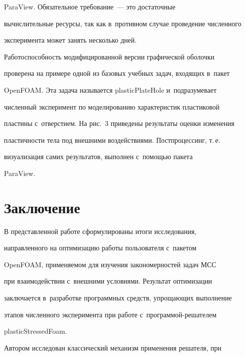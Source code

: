 \mbox{ParaView}. Обязательное требование~--- это достаточные 


вы\-чис\-ли\-тель\-ные ресурсы, так как в~противном случае проведение чис\-лен\-но\-го 


эксперимента может занять несколько дней.


   


   Работоспособность модифицированной версии графической оболочки 


проверена на примере одной из базовых учебных задач, входящих в~пакет 


\mbox{OpenFOAM}. Эта задача называется plasticPlateHole и~подразумевает 


чис\-лен\-ный эксперимент по моделированию характеристик пластиковой 


плас\-ти\-ны с~отверстием. На рис.~3 приведены результаты оценки изменения 


плас\-тич\-ности тела под внеш\-ни\-ми воздействиями. Пост\-про\-цес\-синг, т.\,е.\ 


визуализация самих результатов, выполнен с~по\-мощью пакета 


\mbox{ParaView}.


   








\section{Заключение}





   В представленной работе сформулированы итоги исследования, 


направленного на оптимизацию работы пользователя с~пакетом 


\mbox{OpenFOAM}, применяемом для изучения закономерностей задач МСС 


при взаимодействии с~внеш\-ни\-ми условиями. Результат оптимизации 


заключается в~разработке программных средств, упро\-ща\-ющих выполнение 


этапов чис\-лен\-но\-го эксперимента при работе с~программой-решателем 


\mbox{plasticStressedFoam}. 


   


   Автором исследован классический механизм применения решателя, при 


